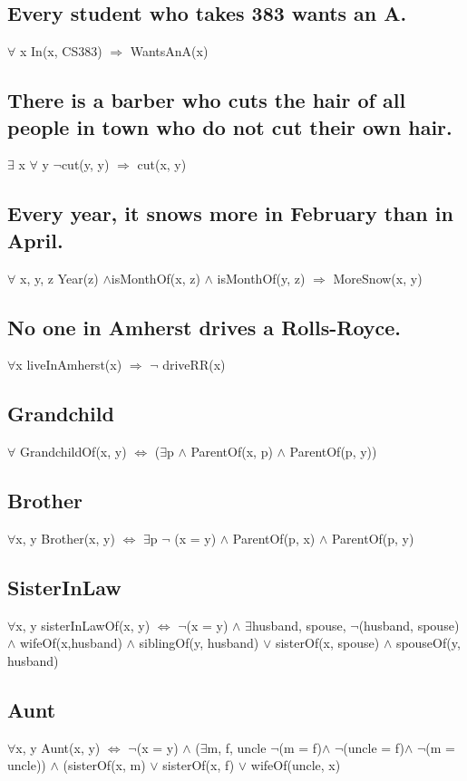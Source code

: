 \documentclass{article}
\begin{document}
\subsection{Every student who takes 383 wants an A.}
$\forall$ x In(x, CS383) $\Rightarrow$ WantsAnA(x)
\subsection{There is a barber who cuts the hair of all people in town who do not cut their own hair.}
$\exists$ x $\forall$ y $\lnot$cut(y, y) $\Rightarrow$ cut(x, y)
\subsection{Every year, it snows more in February than in April.}
$\forall$ x, y, z Year(z) $\land$isMonthOf(x, z) $\land$ isMonthOf(y, z) $\Rightarrow$ MoreSnow(x, y)
\subsection{No one in Amherst drives a Rolls-Royce.}
$\forall$x liveInAmherst(x) $\Rightarrow$ $\lnot$ driveRR(x)
\subsection{Grandchild}
$\forall$ GrandchildOf(x, y) $\Leftrightarrow$  ($\exists$p $\land$ ParentOf(x, p) $\land$ ParentOf(p, y))

\subsection{Brother}
$\forall$x, y Brother(x, y) $\Leftrightarrow$  $\exists$p $\lnot$ (x = y) $\land$ ParentOf(p, x) $\land$ ParentOf(p, y)
\subsection{SisterInLaw}
$\forall$x, y sisterInLawOf(x, y) $\Leftrightarrow$ $\lnot$(x = y) $\land$ $\exists$husband, spouse, $\lnot$(husband, spouse)$\land$ wifeOf(x,husband) $\land$ siblingOf(y, husband) $\lor$ sisterOf(x, spouse) $\land$ spouseOf(y, husband)
\subsection{Aunt}
$\forall$x, y Aunt(x, y) $\Leftrightarrow$ $\lnot$(x = y) $\land$ ($\exists$m, f, uncle $\lnot$(m = f)$\land$ $\lnot$(uncle = f)$\land$ $\lnot$(m = uncle)) $\land$ (sisterOf(x, m) $\lor$ sisterOf(x, f) $\lor$ wifeOf(uncle, x)
\end{document}
